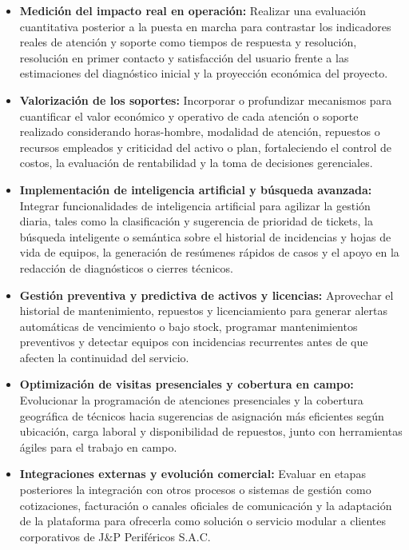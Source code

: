 \begin{itemize}
    \item \textbf{Medici\'on del impacto real en operaci\'on:} Realizar una evaluaci\'on cuantitativa posterior a la puesta en marcha para contrastar los indicadores reales de atenci\'on y soporte como tiempos de respuesta y resoluci\'on, resoluci\'on en primer contacto y satisfacci\'on del usuario frente a las estimaciones del diagn\'ostico inicial y la proyecci\'on econ\'omica del proyecto.

    \item \textbf{Valorizaci\'on de los soportes:} Incorporar o profundizar mecanismos para cuantificar el valor econ\'omico y operativo de cada atenci\'on o soporte realizado considerando horas-hombre, modalidad de atenci\'on, repuestos o recursos empleados y criticidad del activo o plan, fortaleciendo el control de costos, la evaluaci\'on de rentabilidad y la toma de decisiones gerenciales.

    \item \textbf{Implementaci\'on de inteligencia artificial y b\'usqueda avanzada:} Integrar funcionalidades de inteligencia artificial para agilizar la gesti\'on diaria, tales como la clasificaci\'on y sugerencia de prioridad de tickets, la b\'usqueda inteligente o sem\'antica sobre el historial de incidencias y hojas de vida de equipos, la generaci\'on de res\'umenes r\'apidos de casos y el apoyo en la redacci\'on de diagn\'osticos o cierres t\'ecnicos.

    \item \textbf{Gesti\'on preventiva y predictiva de activos y licencias:} Aprovechar el historial de mantenimiento, repuestos y licenciamiento para generar alertas autom\'aticas de vencimiento o bajo stock, programar mantenimientos preventivos y detectar equipos con incidencias recurrentes antes de que afecten la continuidad del servicio.

    \item \textbf{Optimizaci\'on de visitas presenciales y cobertura en campo:} Evolucionar la programaci\'on de atenciones presenciales y la cobertura geogr\'afica de t\'ecnicos hacia sugerencias de asignaci\'on m\'as eficientes seg\'un ubicaci\'on, carga laboral y disponibilidad de repuestos, junto con herramientas \'agiles para el trabajo en campo.

    \item \textbf{Integraciones externas y evoluci\'on comercial:} Evaluar en etapas posteriores la integraci\'on con otros procesos o sistemas de gesti\'on como cotizaciones, facturaci\'on o canales oficiales de comunicaci\'on y la adaptaci\'on de la plataforma para ofrecerla como soluci\'on o servicio modular a clientes corporativos de J\&P Perif\'ericos S.A.C.
\end{itemize}